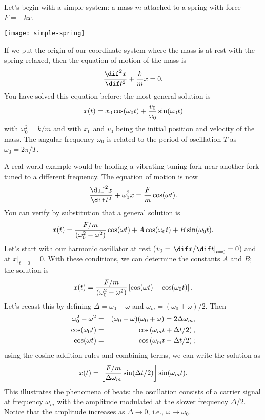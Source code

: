 \begin{sidebar}
Let's begin with a simple system: a mass $m$ attached to a spring with force $F = -kx$.

\begin{center}
\texttt{[image: simple-spring]}
\end{center}

\noindent If we put the origin of our coordinate system where the mass is at rest with the spring relaxed, then the equation of motion of the mass is
\begin{equation}\label{e.SHO-basic}
	\DDtt{x} + \frac{k}{m} x = 0.
\end{equation}
You have solved this equation before: the most general solution is
\begin{equation}\label{e.SHO-general-solution}
	x(t) = x_{0}\cos(\omega_{0} t) + \frac{v_{0}}{\omega_{0}}\sin(\omega_{0} t)
\end{equation}
with $\omega_{0}^{2} = k/m$ and with $x_{0}$ and $v_{0}$ being the initial position and velocity of the mass. The angular frequency $\omega_{0}$ is related to the period of oscillation $T$ as $\omega_{0} = 2\pi/T$.

 A real world example would be holding a vibrating tuning fork near another fork tuned to a different frequency.  The equation of motion is now
\begin{equation}\label{e.SHO-driven}
	\DDtt{x} + \omega_{0}^{2}x = \frac{F}{m}\cos(\wt).
\end{equation}
You can verify by substitution that a general solution is
\[
	x(t) = \frac{F/m}{(\omega_{0}^{2}-\omega^{2})}\cos(\omega t) + A\cos(\omega_{0} t)+B\sin(\omega_{0} t).
\]
Let's start with our harmonic oscillator at rest ($v_{0} = \left.\dif x/\dif t\right|_{t=0} = 0$) and at $\left. x\right|_{t=0} = 0$.  With these conditions, we can determine the constants $A$ and $B$; the solution is
\[
	x(t) = \frac{F/m}{(\omega_{0}^{2}-\omega^{2})}\left[\cos(\omega t)-\cos(\omega_{0} t)\right].
\]
Let's recast this by defining $\Delta = \omega_{0} - \omega$ and $\omega_{m} = (\omega_{0}+\omega)/2$.  Then
\begin{eqnarray*}
  \omega_{0}^{2}-\omega^{2} &=& (\omega_{0}-\omega)(\omega_{0}+\omega) = 2\Delta\omega_{m},\\
  \cos(\omega_{0} t) &=& \cos\left(\omega_{m} t+\Delta t/2\right),\\
  \cos(\omega t) &=& \cos\left(\omega_{m} t-\Delta t/2\right);
\end{eqnarray*}
using the cosine addition rules and combining terms, we can write the solution as
\begin{equation}\label{e.beats}
	x(t) = \left[\frac{F/m}{\Delta\omega_{m}}\sin(\Delta t/2)\right]\sin(\omega_{m} t).
\end{equation}
This illustrates the phenomena of beats: the oscillation consists of a carrier signal at frequency $\omega_{m}$ with the amplitude modulated at the slower frequency $\Delta /2$.  Notice that the amplitude increases as $\Delta \to0$, i.e., $\omega\to\omega_{0}$.


\end{sidebar}
